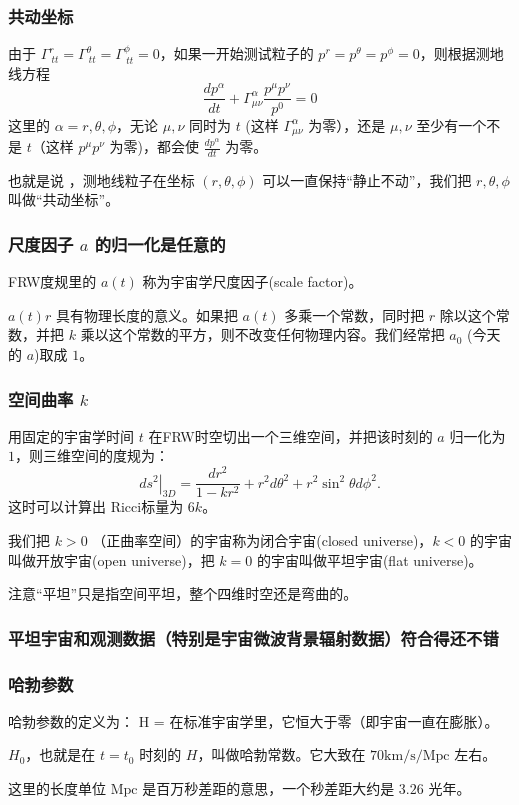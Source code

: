 \documentclass[CJK,13pt]{beamer}
\begin{document}
\begin{frame}
  \frametitle{共动坐标}
  由于 $\Gamma^r_{\ tt}=\Gamma^\theta_{\ tt} =\Gamma^{\phi}_{\ tt}=0$，如果一开始测试粒子的 $p^r=p^\theta=p^\phi = 0$，则根据测地线方程
  $$\frac{d p^\alpha}{dt} + \Gamma^{\alpha}_{\mu\nu}\frac{p^\mu p^\nu}{p^0} = 0$$
  这里的 $\alpha=r, \theta,\phi$，无论 $\mu,\nu$ 同时为 $t$ (这样 $\Gamma^{\alpha}_{\mu\nu}$ 为零），还是 $\mu,\nu$ 至少有一个不是 $t$（这样 $p^\mu p^\nu$ 为零)，都会使 $\frac{d p^\alpha}{dt}$ 为零。

      
  也就是说 ，测地线粒子在坐标 $(r,\theta,\phi)$ 可以一直保持“静止不动”，我们把 $r,\theta,\phi$ 叫做“共动坐标”。  
\end{frame}


\begin{frame}
  \frametitle{尺度因子 $a$ 的归一化是任意的} 
  FRW度规里的 $a(t)$ 称为{\blue 宇宙学尺度因子(scale factor)}。

  \skipline
  
  $a(t)r$ 具有物理长度的意义。如果把 $a(t)$ 多乘一个常数，同时把 $r$ 除以这个常数，并把 $k$ 乘以这个常数的平方，则不改变任何物理内容。我们经常把 $a_0$ (今天的 $a$)取成 $1$。
  
\end{frame}


\begin{frame}
  \frametitle{空间曲率 $k$}
  用固定的宇宙学时间 $t$ 在FRW时空切出一个三维空间，并把该时刻的 $a$ 归一化为 $1$，则三维空间的度规为：
  $$\left.ds^2\right\vert_{3D} = \frac{dr^2}{1-kr^2}+r^2d\theta^2+r^2\sin^2\theta d\phi^2.$$
  这时可以计算出 Ricci标量为 $6k$。

  \skiplines
  
  我们把 $k>0$ （正曲率空间）的宇宙称为闭合宇宙(closed universe)，$k<0$ 的宇宙叫做开放宇宙(open universe)，把 $k=0$ 的宇宙叫做平坦宇宙(flat universe)。

  {\scriptsize 注意“平坦”只是指空间平坦，整个四维时空还是弯曲的。}
  
\end{frame}

\begin{frame}
\frametitle{平坦宇宙和观测数据（特别是宇宙微波背景辐射数据）符合得还不错}
\end{frame}

\begin{frame}
  \frametitle{哈勃参数}
  哈勃参数的定义为：
  \be
  H = 
  \ee
  在标准宇宙学里，它恒大于零（即宇宙一直在膨胀）。

  \skipline

  $H_0$，也就是在 $t=t_0$ 时刻的 $H$，叫做{\blue 哈勃常数}。它大致在 $70\mathrm{km/s/Mpc}$ 左右。

  {\scriptsize 这里的长度单位 $\mathrm{Mpc}$ 是百万秒差距的意思，一个秒差距大约是 $3.26$ 光年。}

\end{frame}
\end{document}
